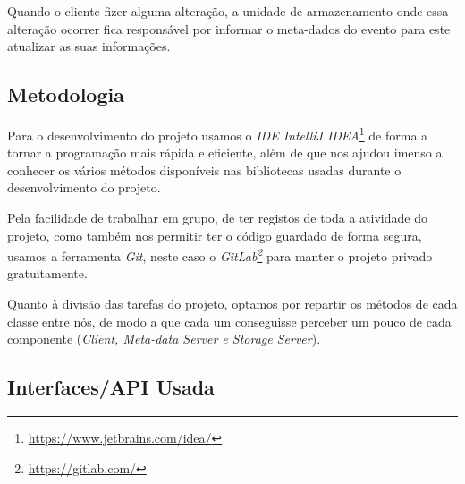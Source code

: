 \documentclass{article}
\begin{document}
Quando o cliente fizer alguma alteração, a unidade de armazenamento onde essa alteração ocorrer fica responsável por informar o meta-dados do evento para este atualizar as suas informações.
 
\subsection{Metodologia}

Para o desenvolvimento do projeto usamos o \textit{IDE IntelliJ IDEA}\footnote{\url{https://www.jetbrains.com/idea/}} de forma a tornar a programação mais rápida e eficiente, além de que nos ajudou imenso a conhecer os vários métodos disponíveis nas bibliotecas usadas durante o desenvolvimento do projeto.

Pela facilidade de trabalhar em grupo, de ter registos de toda a atividade do projeto, como também nos permitir ter o código guardado de forma segura, usamos a ferramenta \textit{Git}, neste caso o \textit{GitLab\footnote{\url{https://gitlab.com/}}} para manter o projeto privado gratuitamente.

Quanto à divisão das tarefas do projeto, optamos por repartir os métodos de cada classe entre nós, de modo a que cada um conseguisse perceber um pouco de cada componente (\textit{Client, Meta-data Server e Storage Server}).

\subsection{Interfaces/API Usada}
\end{document}
